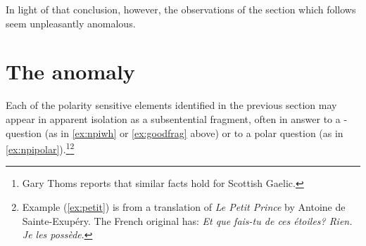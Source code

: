 \documentclass[output=paper,colorlinks,citecolor=brown]{langscibook}
\begin{document}
In light of that conclusion, however, the observations of the section which follows seem unpleasantly anomalous.

\section{The anomaly}
\label{sec:but}

Each of the polarity sensitive elements identified in the previous section may appear in apparent isolation as a subsentential fragment, often in answer to a \WH-question (as in \ref{ex:npiwh} or \ref{ex:goodfrag} above) or to a polar question (as in \ref{ex:npipolar}).\footnote{Gary Thoms reports that similar facts hold for Scottish Gaelic.}\footnote{Example (\ref{ex:petit}) is from a translation of {\itshape Le Petit Prince} by Antoine de Sainte-Exupéry. The French original has: \textit{Et que fais-tu de ces étoiles? Rien. Je les possède}.}
\end{document}
